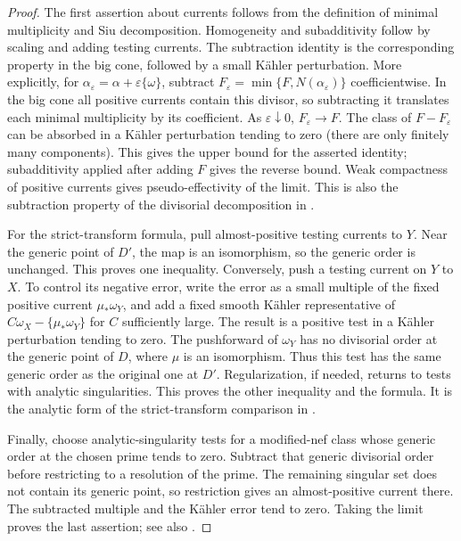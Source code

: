 \begin{proof}
The first assertion about currents follows from the definition of minimal
multiplicity and Siu decomposition. Homogeneity and subadditivity follow by
scaling and adding testing currents. The subtraction identity is the
corresponding property in the big cone, followed by a small Kähler
perturbation. More explicitly, for \(\alpha_\varepsilon=\alpha+
\varepsilon\{\omega\}\), subtract
\(F_\varepsilon=\min\{F,N(\alpha_\varepsilon)\}\) coefficientwise.
In the big cone all positive currents contain this divisor, so subtracting
it translates each minimal multiplicity by its coefficient. As
\(\varepsilon\downarrow0\), \(F_\varepsilon\to F\). The class of
\(F-F_\varepsilon\) can be absorbed in a Kähler perturbation tending to
zero (there are only finitely many components). This gives the upper bound
for the asserted identity; subadditivity applied after adding \(F\) gives
the reverse bound. Weak compactness of positive currents gives
pseudo-effectivity of the limit. This is also the subtraction property of
the divisorial decomposition in \cite[Section~3]{Boucksom2004}.

For the strict-transform formula, pull almost-positive testing currents
to \(Y\). Near the generic point of \(D'\), the map is an isomorphism,
so the generic order is unchanged. This proves one inequality. Conversely,
push a testing current on \(Y\) to \(X\). To control its negative error,
write the error as a small multiple of the fixed positive current
\(\mu_*\omega_Y\), and add a fixed smooth Kähler representative of
\(C\omega_X-\{\mu_*\omega_Y\}\) for \(C\) sufficiently large. The
result is a positive test in a Kähler perturbation tending to zero. The
pushforward of \(\omega_Y\) has no divisorial order at the generic point
of \(D\), where \(\mu\) is an isomorphism. Thus this test has the same
generic order as the original one at \(D'\). Regularization, if needed,
returns to tests with analytic singularities. This proves the other
inequality and the formula. It is the analytic form of the strict-transform
comparison in \cite[Lemma~5.8]{Boucksom2004}.

Finally, choose analytic-singularity tests for a modified-nef class whose
generic order at the chosen prime tends to zero. Subtract that generic
divisorial order before restricting to a resolution of the prime. The
remaining singular set does not contain its generic point, so restriction
gives an almost-positive current there. The subtracted multiple and the
Kähler error tend to zero. Taking the limit proves the last assertion; see
also \cite[Propositions~2.4 and~3.8]{Boucksom2004}.
\end{proof}

